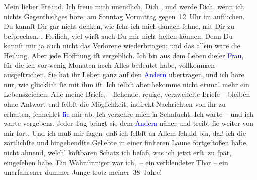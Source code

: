 \pstart{}Mein lieber Freund,\pend
\pstart
           Ich freue mich unendlich, Dich \label{K_L03363-1v}\label{K_L03363-1h},
               und werde Dich, wenn ich nichts Gegentheiliges höre, am Sonntag{ }Vormittag gegen 12 Uhr im \label{K_L03363-2v}\label{K_L03363-2h} aufſuchen. Du
               kannſt Dir gar nicht denken, wie ſehr ich mich danach ſehne, mit Dir zu beſprechen,
                  \label{K_L03363-3v}\label{K_L03363-3h}.
               Freilich, viel wirſt auch Du mir nicht helfen können. {\pb}Denn Du kannſt mir ja auch nicht das Verlorene
               wiederbringen; und das allein wäre die Heilung. Aber jede Hoffnung iſt vergeblich.
               Ich bin aus dem Leben dieſer \textcolor{blue}{Frau}{}\ledrightnote{{$\rightarrow$}\textcolor{blue}{Theodore Rottenberg}},  für die ich vor wenig Monaten
               noch Alles bedeutet habe, vollkommen ausgeſtrichen. Sie hat ihr Leben ganz auf den
                  \textcolor{blue}{Andern}{}\ledrightnote{{$\rightarrow$}\textcolor{blue}{?? [Partner von Theodore Rottenberg, Ende 1902/Anfang 1903]}} übertragen, und
               ich höre nur, wie glücklich ſie mit ihm iſt. Ich ſelbſt aber bekomme nicht einmal
               mehr ein Lebenszeichen. Alle meine Briefe, – flehende, reuige, verzweifelte Briefe –
                  {\pb}bleiben ohne Antwort und ſelbſt die Möglichkeit,
               indirekt Nachrichten\strikeout{\textcolor{gray}{×}} von ihr zu erhalten, ſchneidet \textcolor{blue}{ſie}{}\ledrightnote{{$\rightarrow$}\textcolor{blue}{Theodore Rottenberg}} mir ab. Ich verzehre mich in Sehnſucht. Ich warte – und
               ich warte vergebens. Jeder Tag bringt sie dem \textcolor{blue}{Andern}{}\ledrightnote{{$\rightarrow$}\textcolor{blue}{?? [Partner von Theodore Rottenberg, Ende 1902/Anfang 1903]}}{ } näher und treibt ſie weiter von mir fort. Und ich
               muß mir ſagen, daß ich ſelbſt an Allem ſchuld \introOben{}bin\introOben{}, daß ich
               die zärtlichſte und hingebendſte Geliebte in einer finſteren Laune fortgeſtoßen habe,
               nicht ahnend, {\pb}welch’ koſtbaren Schatz ich beſaß,
               was ich jetzt erſt, zu ſpät, eingeſehen habe. Ein Wahnſinniger war ich, – ein
               verblendeter Thor – ein unerfahrener dummer Junge trotz meiner 38 Jahre! {\dotsfour}\pend
           
